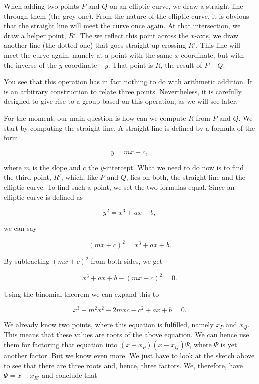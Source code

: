 \documentclass[tikz]{scrreprt}
\begin{document}
When adding two points $P$ and $Q$ on an elliptic curve, 
we draw a straight line through them (the grey one).
From the nature of the elliptic curve, it is obvious
that the straight line will meet the curve once again.
At that intersection, we draw a helper point, $R'$.
The we reflect this point across the $x$-axis, \ie
we draw another line (the dotted one) that goes
straight up crossing $R'$. This line will meet the curve
again, namely at a point with the same $x$ coordinate,
but with the inverse of the $y$ coordinate $-y$.
That point is $R$, the result of $P + Q$.

You see that this operation has in fact nothing to do
with arithmetic addition. It is an arbitrary construction
to relate three points.
Nevertheless, it is carefully designed to give rise
to a group based on this operation, as we will see later.

For the moment, our main question is how can we
compute $R$ from $P$ and $Q$. We start by computing
the straight line. A straight line is defined by
a formula of the form

\begin{equation}
y = mx + c,
\end{equation}

where $m$ is the slope and $c$ the $y$-intercept.
What we need to do now is to find the third point,
$R'$, which, like $P$ and $Q$, lies on both,
the straight line and the elliptic curve.
To find such a point, we set the two formulas
equal. Since an elliptic curve is defined as

\begin{equation}  
y^2 = x^3 + ax + b, 
\end{equation}  

we can say

\begin{equation}  
(mx + c)^2 = x^3 + ax + b.
\end{equation}

By subtracting $(mx+c)^2$ from both sides, we get

\begin{equation}  
x^3 + ax + b - (mx + c)^2 = 0.
\end{equation}

Using the binomial theorem 
we can expand this to

\begin{equation}  
x^3 - m^2x^2 - 2mxc - c^2 + ax + b = 0.
\end{equation}

We already know two points, where this equation is fulfilled,
namely $x_P$ and $x_Q$. This means that these values
are roots of the above equation. We can hence use them for
factoring that equation into $(x-x_P)(x-x_Q)\Psi$,
where $\Psi$ is yet another factor. But we know even more.
We just have to look at the sketch above to see that there
are three roots and, hence, three factors. 
We, therefore, have $\Psi = x - x_{R'}$ and conclude that
\end{document}
